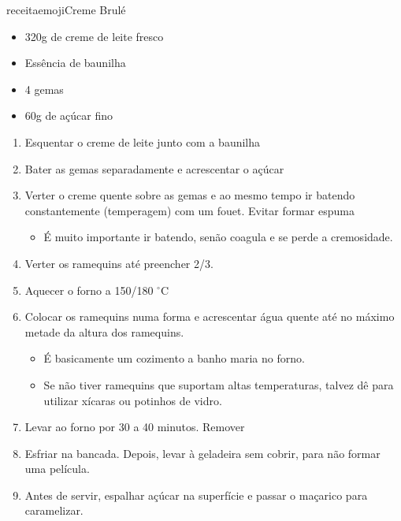 receitaemoji{Creme Brulé}{
	\begin{itemize}
		\item 320g de creme de leite fresco
		\item Essência de baunilha
		\item 4 gemas
		\item 60g de açúcar fino
	\end{itemize}
}{
	\begin{enumerate}
		\item Esquentar o creme de leite junto com a baunilha
		\item Bater as gemas separadamente e acrescentar o açúcar
		\item Verter o creme quente sobre as gemas e ao mesmo tempo ir batendo
		      constantemente (temperagem) com um fouet. Evitar formar espuma
		      \begin{itemize}
			      \item É muito importante ir batendo, senão coagula e se perde a cremosidade.
		      \end{itemize}
		\item Verter os ramequins até preencher 2/3.
		\item Aquecer o forno a 150/180 $^\circ$C
		\item Colocar os ramequins numa forma e acrescentar água quente até no máximo
		      metade da altura dos ramequins.
		      \begin{itemize}
			      \item É basicamente um cozimento a banho maria no forno.
			      \item Se não tiver ramequins que suportam altas temperaturas, talvez dê para
			            utilizar xícaras ou potinhos de vidro.
		      \end{itemize}
		\item Levar ao forno por 30 a 40 minutos. Remover
		\item Esfriar na bancada. Depois, levar à geladeira sem cobrir, para não
		      formar uma película.
		\item Antes de servir, espalhar açúcar na superfície e passar o maçarico para
		      caramelizar.
	\end{enumerate}
}

